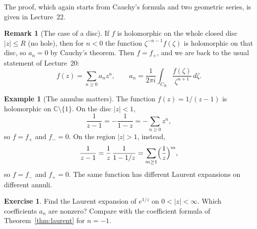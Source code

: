\documentclass[11pt]{article}
\theoremstyle{plain}
\theoremstyle{definition}
\newtheorem{example}[theorem]{Example}
\newtheorem{exercise}[theorem]{Exercise}
\theoremstyle{boldremark}
\newtheorem*{remark}{Remark}
\theoremstyle{remark}
\numberwithin{equation}{section}
\newcommand{\C}{\mathbb{C}}
\newenvironment{lecturefigure}
 {\par\addvspace{0.25em}\begingroup\setlength{\parskip}{0pt}\centering}
 {\par\endgroup\addvspace{0.25em}}
\begin{document}
\begin{lecturefigure}
\end{lecturefigure}

The proof, which again starts from Cauchy's formula and two geometric
series, is given in Lecture~22.


\begin{remark}[The case of a disc]
	If $f$ is holomorphic on the whole closed disc $|z|\leq R$ (no hole),
	then for $n<0$ the function $\zeta^{-n-1}f(\zeta)$ is holomorphic on that
	disc, so $a_n=0$ by Cauchy's theorem. Then $f=f_+$, and we are back to the
	usual statement of Lecture~20:
	\[
	f(z)=\sum_{n\geq0}a_nz^n,\qquad
	a_n=\frac{1}{2\pi i}\int_{C_R}\frac{f(\zeta)}{\zeta^{n+1}}\,d\zeta .
	\]
\end{remark}



\begin{example}[The annulus matters]\label{ex:annulus-matters}
The function $f(z)=1/(z-1)$ is holomorphic on $\C\setminus\{1\}$.
On the disc $|z|<1$,
\[
 \frac{1}{z-1}=-\frac{1}{1-z}=-\sum_{n\geq0}z^n,
\]
so $f=f_+$ and $f_-=0$. On the region $|z|>1$, instead,
\[
 \frac{1}{z-1}=\frac1z\,\frac{1}{1-1/z}=\sum_{m\geq1}\Bigl(\frac1z\Bigr)^m,
\]
so $f=f_-$ and $f_+=0$. The same function has different Laurent
expansions on different annuli.
\end{example}

\begin{exercise}
Find the Laurent expansion of $e^{1/z}$ on $0<|z|<\infty$. Which
coefficients $a_n$ are nonzero? Compare with the coefficient formula of
Theorem~\ref{thm:laurent} for $n=-1$.
\end{exercise}
\end{document}
